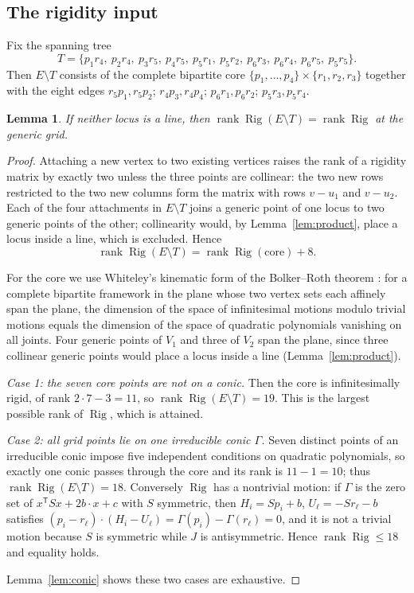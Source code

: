\documentclass[11pt]{article}
\newtheorem{lemma}{Lemma}
\theoremstyle{remark}
\begin{document}
\subsection{The rigidity input}
Fix the spanning tree
\[
 T=\{p_1r_4,\ p_2r_4,\ p_3r_5,\ p_4r_5,\ p_5r_1,\ p_5r_2,\ p_6r_3,\
      p_6r_4,\ p_6r_5,\ p_5r_5\}.
\]
Then $E\setminus T$ consists of the complete bipartite core
$\{p_1,\ldots,p_4\}\times\{r_1,r_2,r_3\}$ together with the eight
edges $r_5p_1,r_5p_2$; $r_4p_3,r_4p_4$; $p_6r_1,p_6r_2$;
$p_5r_3,p_5r_4$.

\begin{lemma}
\label{lem:rigid}
If neither locus is a line, then
$\operatorname{rank}\operatorname{Rig}(E\setminus T)
=\operatorname{rank}\operatorname{Rig}$ at the generic grid.
\end{lemma}
\begin{proof}
Attaching a new vertex to two existing vertices raises the rank of a
rigidity matrix by exactly two unless the three points are collinear:
the two new rows restricted to the two new columns form the matrix
with rows $v-u_1$ and $v-u_2$. Each of the four attachments in
$E\setminus T$ joins a generic point of one locus to two generic
points of the other; collinearity would, by Lemma~\ref{lem:product},
place a locus inside a line, which is excluded. Hence
\[
 \operatorname{rank}\operatorname{Rig}(E\setminus T)
 =\operatorname{rank}\operatorname{Rig}(\text{core})+8 .
\]

For the core we use Whiteley's kinematic form of the Bolker--Roth
theorem \cite[Theorem~1, Case~1]{whiteleyBipartite}: for a complete
bipartite framework in the plane whose two vertex sets each affinely
span the plane, the dimension of the space of infinitesimal motions
modulo trivial motions equals the dimension of the space of quadratic
polynomials vanishing on all joints. Four generic points of $V_1$ and
three of $V_2$ span the plane, since three collinear generic points
would place a locus inside a line (Lemma~\ref{lem:product}).

\emph{Case 1: the seven core points are not on a conic.} Then the
core is infinitesimally rigid, of rank $2\cdot7-3=11$, so
$\operatorname{rank}\operatorname{Rig}(E\setminus T)=19$. This is the
largest possible rank of $\operatorname{Rig}$, which is attained.

\emph{Case 2: all grid points lie on one irreducible conic $\Gamma$.}
Seven distinct points of an irreducible conic impose five independent
conditions on quadratic polynomials, so exactly one conic passes
through the core and its rank is $11-1=10$; thus
$\operatorname{rank}\operatorname{Rig}(E\setminus T)=18$. Conversely
$\operatorname{Rig}$ has a nontrivial motion: if $\Gamma$ is the zero
set of $x^{\mathsf T}Sx+2b\cdot x+c$ with $S$ symmetric, then
$H_i=Sp_i+b$, $U_\ell=-Sr_\ell-b$ satisfies
$(p_i-r_\ell)\cdot(H_i-U_\ell)=\Gamma(p_i)-\Gamma(r_\ell)=0$, and it
is not a trivial motion because $S$ is symmetric while $J$ is
antisymmetric. Hence $\operatorname{rank}\operatorname{Rig}\le18$ and
equality holds.

Lemma~\ref{lem:conic} shows these two cases are exhaustive.
\end{proof}
\end{document}
